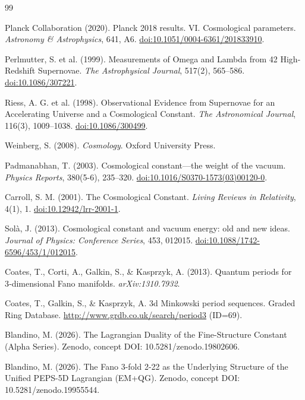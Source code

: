 \documentclass[12pt]{article}
\begin{document}

\begin{thebibliography}{99}

Planck Collaboration (2020). Planck 2018 results. VI. Cosmological parameters.
\textit{Astronomy \& Astrophysics}, 641, A6. \href{https://doi.org/10.1051/0004-6361/201833910}{doi:10.1051/0004-6361/201833910}.

Perlmutter, S. et al. (1999). Measurements of Omega and Lambda from 42 High-Redshift Supernovae.
\textit{The Astrophysical Journal}, 517(2), 565–586. \href{https://doi.org/10.1086/307221}{doi:10.1086/307221}.

Riess, A. G. et al. (1998). Observational Evidence from Supernovae for an Accelerating Universe and a Cosmological Constant.
\textit{The Astronomical Journal}, 116(3), 1009–1038. \href{https://doi.org/10.1086/300499}{doi:10.1086/300499}.

Weinberg, S. (2008). \textit{Cosmology}. Oxford University Press.

Padmanabhan, T. (2003). Cosmological constant—the weight of the vacuum.
\textit{Physics Reports}, 380(5-6), 235–320. \href{https://doi.org/10.1016/S0370-1573(03)00120-0}{doi:10.1016/S0370-1573(03)00120-0}.

Carroll, S. M. (2001). The Cosmological Constant.
\textit{Living Reviews in Relativity}, 4(1), 1. \href{https://doi.org/10.12942/lrr-2001-1}{doi:10.12942/lrr-2001-1}.

Sol{\`a}, J. (2013). Cosmological constant and vacuum energy: old and new ideas.
\textit{Journal of Physics: Conference Series}, 453, 012015. \href{https://doi.org/10.1088/1742-6596/453/1/012015}{doi:10.1088/1742-6596/453/1/012015}.

Coates, T., Corti, A., Galkin, S., \& Kasprzyk, A. (2013). Quantum periods for 3‑dimensional Fano manifolds.
\textit{arXiv:1310.7932}.

Coates, T., Galkin, S., \& Kasprzyk, A.
3d Minkowski period sequences.
Graded Ring Database.
\url{http://www.grdb.co.uk/search/period3} (ID=69).

Blandino, M. (2026). The Lagrangian Duality of the Fine-Structure Constant (Alpha Series). Zenodo, concept DOI: 10.5281/zenodo.19802606.

Blandino, M. (2026). The Fano 3-fold 2-22 as the Underlying Structure of the Unified PEPS-5D Lagrangian (EM+QG). Zenodo, concept DOI: 10.5281/zenodo.19955544.

\end{thebibliography}
\end{document}

